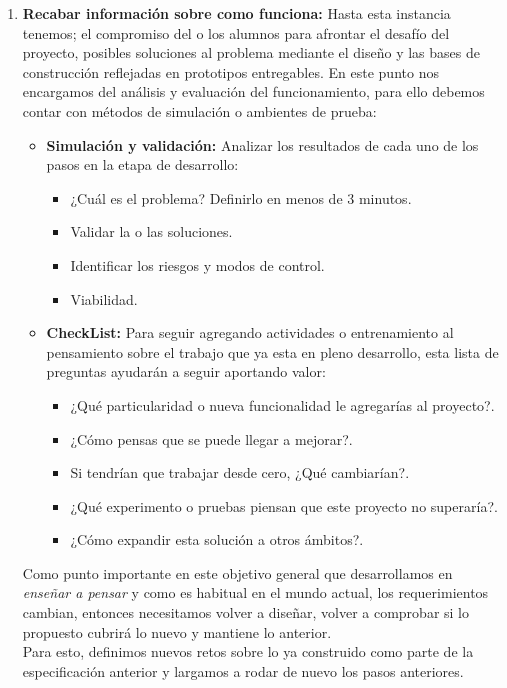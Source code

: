 \begin{enumerate}
 \item \textbf{Recabar informaci\'on sobre como funciona:}
  Hasta esta instancia tenemos; el compromiso del o los alumnos para afrontar el desaf\'io del proyecto, posibles soluciones al problema mediante el dise\~no y
  las bases de construcci\'on reflejadas en prototipos entregables. En este punto nos encargamos del an\'alisis y evaluaci\'on del funcionamiento, para ello 
  debemos contar con m\'etodos de simulaci\'on o ambientes de prueba:
  \begin{itemize}
   \item \textbf{Simulaci\'on y validaci\'on:}
   Analizar los resultados de cada uno de los pasos en la etapa de desarrollo:
   \begin{itemize}
    \item ¿Cu\'al es el problema? Definirlo en menos de 3 minutos.
    \item Validar la o las soluciones.
    \item Identificar los riesgos y modos de control.
    \item Viabilidad.
   \end{itemize}

   \item \textbf{CheckList:}
   Para seguir agregando actividades o entrenamiento al pensamiento sobre el trabajo que ya esta en pleno desarrollo, esta lista de preguntas ayudar\'an
   a seguir aportando valor:\\
   \begin{itemize}
    \item ¿Qu\'e particularidad o nueva funcionalidad le agregar\'ias al proyecto?.
    \item ¿C\'omo pensas que se puede llegar a mejorar?.
    \item Si tendr\'ian que trabajar desde cero, ¿Qu\'e cambiar\'ian?.
    \item ¿Qu\'e experimento o pruebas piensan que este proyecto no superar\'ia?.
    \item ¿C\'omo expandir esta soluci\'on a otros \'ambitos?.
   \end{itemize}
  
  \end{itemize}
  Como punto importante en este objetivo general que desarrollamos en \textsl{ense\~nar a pensar} y como es habitual en el mundo actual, los requerimientos 
  cambian, entonces necesitamos volver a dise\~nar, volver a comprobar si lo propuesto cubrir\'a lo nuevo y mantiene lo anterior.\\
  Para esto, definimos nuevos retos sobre lo ya construido como parte de la especificaci\'on anterior y largamos a rodar de nuevo los pasos anteriores.
\end{enumerate}

